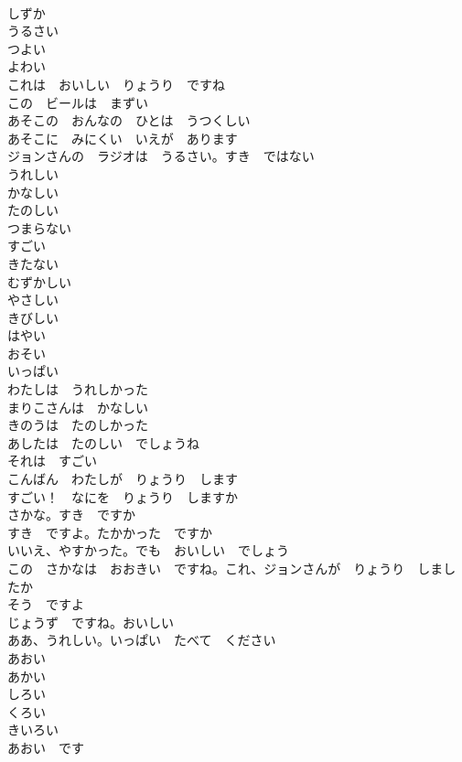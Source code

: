 \documentclass[8pt]{extreport}
\begin{document}
\begin{CJK}{UTF8}{min}
\\	しずか	
\\	うるさい	
\\	つよい	
\\	よわい	
\\	これは　おいしい　りょうり　ですね	
\\	この　ビールは　まずい	
\\	あそこの　おんなの　ひとは　うつくしい	
\\	あそこに　みにくい　いえが　あります	
\\	ジョンさんの　ラジオは　うるさい。すき　ではない	
\\	うれしい	
\\	かなしい	
\\	たのしい	
\\	つまらない	
\\	すごい	
\\	きたない	
\\	むずかしい	
\\	やさしい	
\\	きびしい	
\\	はやい	
\\	おそい	
\\	いっぱい	
\\	わたしは　うれしかった	
\\	まりこさんは　かなしい	
\\	きのうは　たのしかった	
\\	あしたは　たのしい　でしょうね	
\\	それは　すごい	
\\	こんばん　わたしが　りょうり　します	
\\	すごい！　なにを　りょうり　しますか	
\\	さかな。すき　ですか	
\\	すき　ですよ。たかかった　ですか	
\\	いいえ、やすかった。でも　おいしい　でしょう	
\\	この　さかなは　おおきい　ですね。これ、ジョンさんが　りょうり　しましたか	
\\	そう　ですよ	
\\	じょうず　ですね。おいしい	
\\	ああ、うれしい。いっぱい　たべて　ください	
\\	あおい	
\\	あかい	
\\	しろい	
\\	くろい	
\\	きいろい	
\\	あおい　です	

\end{CJK}
\end{document}

